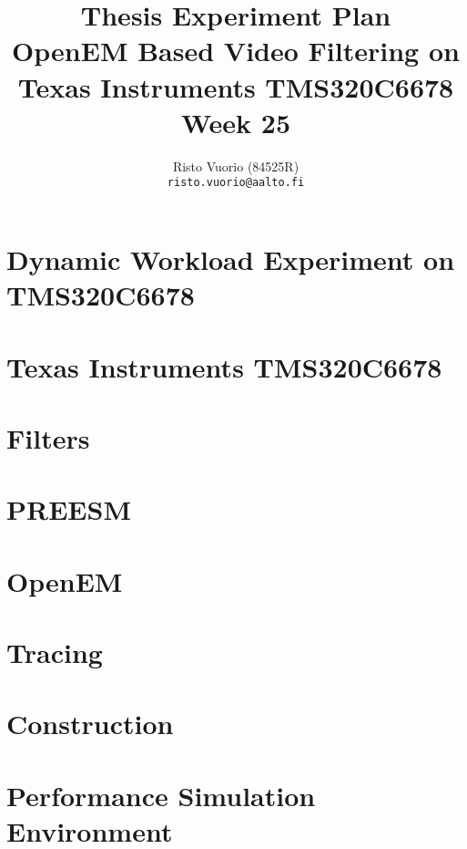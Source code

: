 \documentclass[a4paper,10pt]{article}
\title{Thesis Experiment Plan \\
		OpenEM Based Video Filtering on Texas Instruments TMS320C6678 \\
		Week 25}
\author{Risto Vuorio (84525R) \\
		{\tt risto.vuorio@aalto.fi}}
\begin{document}
\maketitle
\newpage
\tableofcontents
\newpage

\section{Dynamic Workload Experiment on TMS320C6678}


\section{Texas Instruments TMS320C6678}


\section{Filters}


\section{PREESM}


\section{OpenEM}


\section{Tracing}


\section{Construction}


\section{Performance Simulation Environment}


%   

%   
\end{document}
